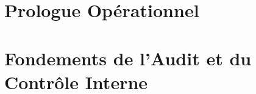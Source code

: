 \documentclass[12pt, twoside, openright, a4paper]{book}
\begin{document}
\frontmatter

    
    \cleardoublepage

    
    \cleardoublepage

    
    \cleardoublepage

    
    \cleardoublepage

    \tableofcontents
    \cleardoublepage

    \listoffigures
    \listoftables
    \cleardoublepage

\mainmatter

    \part*{Prologue Opérationnel}

        \setcounter{chapter}{-1}
        

    \part{Fondements de l'Audit et du Contrôle Interne}
    \label{part:fondements}

        
        
        
        
\end{document}
